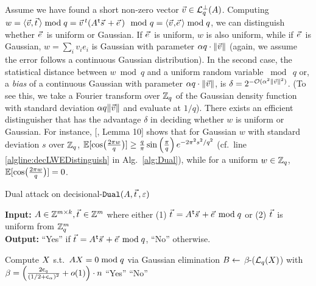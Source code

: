Assume we have found a short non-zero vector $\vvec \in \qLATTp (\AMat)$. Computing $w = \langle\vvec,\tvec\rangle \bmod q = \vvec^t (\AMat\transpose \svec + \evec ) \mod q = \ScProd{\vvec}{\evec} \bmod q$, we can distinguish whether $\evec$ is uniform or Gaussian. 
If $\evec$ is uniform, $w$ is also uniform, while if $\evec$ is Gaussian, $w = \sum_i v_i e_i$ is Gaussian with parameter $\alpha q \cdot \| \vvec \|$ (again, we assume the \LWE error follows a continuous Gaussian distribution). 
In the second case, the statistical distance between $w \bmod q$ and a uniform random variable $\bmod \ q$ or, a \emph{bias} of a continuous Gaussian with parameter $\alpha q \cdot \| \vvec \|$, is $\delta = 2^{-\bigO(\alpha^2 \| \vvec \|^2)}$. 
(To see this, we take a Fourier transform over ${{\mathbb Z}}_q$ of the Gaussian density function with standard deviation $\alpha q \| \vvec \|$ and evaluate at $1/q$). 
There exists an efficient distinguisher that has the advantage $\delta$ in deciding whether $w$ is uniform or Gaussian. 
For instance, [\cite{EC:DucTraVau15}, Lemma 10] shows that for Gaussian $w$ with standard deviation $s$ over ${{\mathbb Z}}_q$, $\operatorname*{\mathbb{E}}[\cos \bigl( \tfrac{2 \pi w}{q}\bigr)] \geq \frac{q}{\pi} \sin \left( \tfrac{\pi}{q}\right) e^{-2 \pi^2 s^2/q^2} $ (cf.\ line \ref{algline:decLWEDistinguish} in Alg.~\ref{alg:Dual}), while for a uniform $w \in {{\mathbb Z}}_q$, $\operatorname*{\mathbb{E}}[\cos \bigl( \tfrac{2 \pi w}{q}\bigr)] = 0$.

%
%
\setlength{\intextsep}{\medskipamount}
\begin{algorithm}[t]
\caption{ Dual attack on decisional-\LWE $\DUAL (\AMat, \protect \tvec, \eps)$}
\label{alg:Dual}
\textbf{Input:} $\AMat \in \Z^{m \times k}, \tvec \in \Z^m$ where  either (1) $\tvec = \AMat\transpose \svec + \evec \bmod q$ or (2) $\tvec$ is uniform from ${{\mathbb Z}}_q^m$  \\
\textbf{Output:} ``Yes'' if $\tvec = \AMat\transpose \svec + \evec \bmod q$, ``No'' otherwise.
\begin{algorithmic}[1]
	\State Compute $X$ s.t.\ $A X = 0 \bmod q$ via Gaussian elimination
	\State $B \gets$ $\beta$-\BKZ ($\mathcal{L}_q(X)$) with $\beta = \left( \frac{2 \mathsf{c}_q}{(1/2 + \mathsf{c}_{\alpha})^2} + o(1) \right) \cdot n$ 
	\normalsize
		\normalsize
		 \label{algline:decLWEDistinguish}
			\State \Return ``Yes''
		\Else
			\State \Return ``No''
		\EndIf
	\EndIf
\end{algorithmic} 
\end{algorithm}

